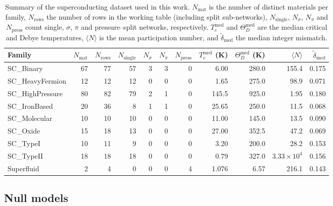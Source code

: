 \documentclass[aps,prb,twocolumn,superscriptaddress,floatfix,nofootinbib]{revtex4-2}
\begin{document}
\begin{table}[t]
  \caption{Summary of the superconducting dataset used in this work.
  $N_{\mathrm{mat}}$ is the number of distinct materials per family,
  $N_{\mathrm{rows}}$ the number of rows in the working table
  (including split sub-networks),
  $N_{\mathrm{single}}$, $N_{\sigma}$, $N_{\pi}$ and
  $N_{\mathrm{press}}$ count single, $\sigma$, $\pi$ and
  pressure--split networks, respectively.
  $T_c^{\mathrm{med}}$ and $\Theta_D^{\mathrm{med}}$ are the median
  critical and Debye temperatures, $\langle N\rangle$ is the mean
  participation number, and $\tilde\delta_{\mathrm{med}}$ the median
  integer mismatch.}
  \label{tab:dataset_summary}
  \begin{ruledtabular}
  \begin{tabular}{lrrrrrrrrrr}
    Family &
    $N_{\mathrm{mat}}$ &
    $N_{\mathrm{rows}}$ &
    $N_{\mathrm{single}}$ &
    $N_{\sigma}$ &
    $N_{\pi}$ &
    $N_{\mathrm{press}}$ &
    $T_c^{\mathrm{med}}$ (K) &
    $\Theta_D^{\mathrm{med}}$ (K) &
    $\langle N\rangle$ &
    $\tilde\delta_{\mathrm{med}}$ \\
    \hline
    SC\_Binary       & 67 & 77 & 57 & 3 & 3 & 0 &  6.00  & 280.0 & 155.4         & 0.175 \\
    SC\_HeavyFermion & 12 & 12 & 12 & 0 & 0 & 0 &  1.65  & 275.0 &  98.9         & 0.071 \\
    SC\_HighPressure & 80 & 82 & 79 & 2 & 1 & 0 & 145.5  & 925.0 &   1.95        & 0.180 \\
    SC\_IronBased    & 20 & 36 &  8 & 1 & 1 & 0 & 25.65  & 250.0 &  11.5         & 0.068 \\
    SC\_Molecular    & 10 & 10 & 10 & 0 & 0 & 0 & 11.00  & 145.0 &  13.5         & 0.090 \\
    SC\_Oxide        & 15 & 18 & 13 & 0 & 0 & 0 & 27.00  & 352.5 &  47.2         & 0.069 \\
    SC\_TypeI        & 10 & 11 &  9 & 0 & 0 & 0 &  3.20  & 200.0 &  28.2         & 0.153 \\
    SC\_TypeII       & 18 & 18 & 18 & 0 & 0 & 0 &  0.79  & 327.0 & $3.33\times10^{4}$ & 0.156 \\
    Superfluid       &  2 &  4 &  0 & 0 & 0 & 4 &  1.076 &  6.57 & 216.1         & 0.143 \\
  \end{tabular}
  \end{ruledtabular}
\end{table}

\subsection{Null models}
\end{document}
